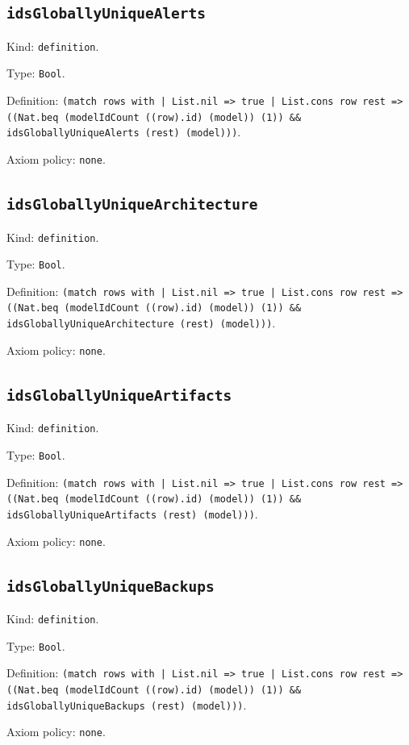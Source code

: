 \documentclass[11pt]{article}
\begin{document}
\subsection*{\texttt{idsGloballyUniqueAlerts}}
\noindent Kind: \texttt{definition}.\par
\noindent Type: \texttt{Bool}.\par
\noindent Definition: \texttt{(match rows with | List.nil => true | List.cons row rest => ((Nat.beq (modelIdCount ((row).id) (model)) (1)) \&\& idsGloballyUniqueAlerts (rest) (model)))}.\par
\noindent Axiom policy: \texttt{none}.\par
\subsection*{\texttt{idsGloballyUniqueArchitecture}}
\noindent Kind: \texttt{definition}.\par
\noindent Type: \texttt{Bool}.\par
\noindent Definition: \texttt{(match rows with | List.nil => true | List.cons row rest => ((Nat.beq (modelIdCount ((row).id) (model)) (1)) \&\& idsGloballyUniqueArchitecture (rest) (model)))}.\par
\noindent Axiom policy: \texttt{none}.\par
\subsection*{\texttt{idsGloballyUniqueArtifacts}}
\noindent Kind: \texttt{definition}.\par
\noindent Type: \texttt{Bool}.\par
\noindent Definition: \texttt{(match rows with | List.nil => true | List.cons row rest => ((Nat.beq (modelIdCount ((row).id) (model)) (1)) \&\& idsGloballyUniqueArtifacts (rest) (model)))}.\par
\noindent Axiom policy: \texttt{none}.\par
\subsection*{\texttt{idsGloballyUniqueBackups}}
\noindent Kind: \texttt{definition}.\par
\noindent Type: \texttt{Bool}.\par
\noindent Definition: \texttt{(match rows with | List.nil => true | List.cons row rest => ((Nat.beq (modelIdCount ((row).id) (model)) (1)) \&\& idsGloballyUniqueBackups (rest) (model)))}.\par
\noindent Axiom policy: \texttt{none}.\par
\end{document}
